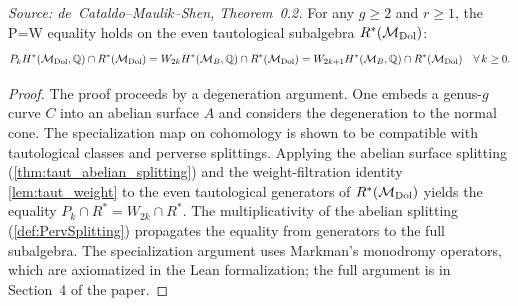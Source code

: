 \begin{theorem}[P=W for even tautological classes]
  \label{thm:PW_even}
  \textit{Source: de~Cataldo--Maulik--Shen, Theorem~0.2.}
  For any \(g \geq 2\) and \(r \geq 1\), the P=W equality holds on the even
  tautological subalgebra \(R^*(\mathcal{M}_{\mathrm{Dol}})\):
  \[
    P_k H^*(\mathcal{M}_{\mathrm{Dol}},\mathbb{Q}) \cap R^*(\mathcal{M}_{\mathrm{Dol}})
      = W_{2k} H^*(\mathcal{M}_B,\mathbb{Q}) \cap R^*(\mathcal{M}_{\mathrm{Dol}})
      = W_{2k+1} H^*(\mathcal{M}_B,\mathbb{Q}) \cap R^*(\mathcal{M}_{\mathrm{Dol}})
    \quad \forall\, k \geq 0.
  \]
\end{theorem}

\begin{proof}
  The proof proceeds by a degeneration argument.  One embeds a genus-\(g\)
  curve \(C\) into an abelian surface \(A\) and considers the degeneration
  to the normal cone.  The specialization map on cohomology is shown to be
  compatible with tautological classes and perverse splittings.  Applying
  the abelian surface splitting (\cref{thm:taut_abelian_splitting}) and
  the weight-filtration identity \cref{lem:taut_weight} to the even
  tautological generators of \(R^*(\mathcal{M}_{\mathrm{Dol}})\) yields the equality
  \(P_k \cap R^* = W_{2k} \cap R^*\).  The multiplicativity of the abelian
  splitting (\cref{def:PervSplitting}) propagates the equality from
  generators to the full subalgebra.
  The specialization argument uses Markman's monodromy operators, which are
  axiomatized in the Lean formalization; the full argument is in Section~4
  of the paper.
\end{proof}

